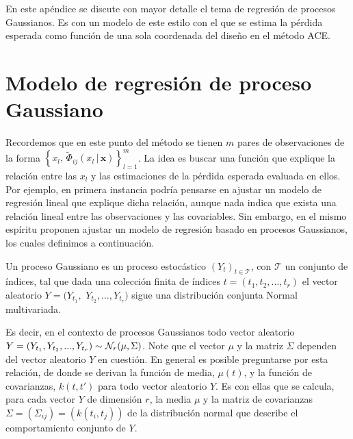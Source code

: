 En este apéndice se discute con mayor detalle el tema de regresión de procesos Gaussianos. Es con un modelo de este estilo con el que se estima la pérdida esperada como función de una sola coordenada del diseño en el método ACE.



\section*{Modelo de regresión de proceso Gaussiano} 



Recordemos que en este punto del método se tienen $m$ pares de observaciones de la forma $\left\{ x_l, \, \tilde{\Phi}_{ij}(x_l \, | \, \mathbf{x} ) \right\}_{l=1}^{m}$. La idea es buscar una función que explique la relación entre las $x_l$ y las estimaciones de la pérdida esperada evaluada en ellos. Por ejemplo, en primera instancia podría pensarse en ajustar un modelo de regresión lineal que explique dicha relación, aunque nada indica que exista una relación lineal entre las observaciones y las covariables. Sin embargo, en el mismo espíritu \cite{Woods_ACE} proponen ajustar un modelo de regresión basado en procesos Gaussianos, los cuales definimos a continuación.

\newpage

\begin{definition} \label{def:gaussian_process}
	Un proceso Gaussiano es un proceso estocástico $\left( Y_t \right)_{t \in \mathcal{T}}$, con $\mathcal{T}$ un conjunto de índices, tal que dada una colección finita de índices $t = (t_1, t_2, ..., t_r)$ el vector aleatorio $Y = (Y_{t_1},$ $Y_{t_2}, ..., Y_{t_r})$ sigue una distribución conjunta Normal multivariada.
\end{definition}



Es decir, en el contexto de procesos Gaussianos todo vector aleatorio $Y = (Y_{t_1}, Y_{t_2}, ..., Y_{t_r}) \sim \mathcal{N}_r( \mu, \Sigma ) $. Note que el vector $\mu$ y la matriz $\Sigma$ dependen del vector aleatorio $Y$ en cuestión. En general es posible preguntarse por esta relación, de donde se derivan la función de media, $\mu(t)$, y la función de covarianzas, $k(t, t')$ para todo vector aleatorio $Y$. Es con ellas que se calcula, para cada vector $Y$ de dimensión $r$, la media $\mu$ y la matriz de covarianzas $\Sigma = (\Sigma_{ij}) = (k(t_i, t_j))$ de la distribución normal que describe el comportamiento conjunto de $Y$. \\




